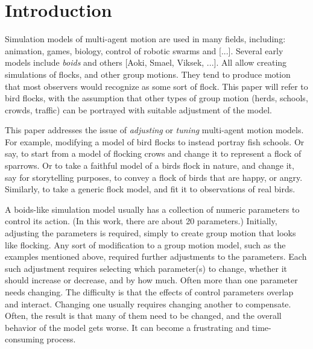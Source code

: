\documentclass[letterpaper]{article}
\begin{document}


\section{Introduction}
\label{sec:intro}

Simulation models of multi-agent motion are used in many fields, including: animation, games, biology, control of robotic swarms and [...]. Several early models include \textit{boids} \citep{reynolds_flocks_1987} and others [Aoki, Smael, Viksek, ...]. All allow creating simulations of flocks, and other group motions.  They tend to produce motion that most observers would recognize as some sort of flock. This paper will refer to bird flocks, with the assumption that other types of group motion (herds, schools, crowds, traffic) can be portrayed with suitable adjustment of the model.
\par

This paper addresses the issue of \textit{adjusting} or \textit{tuning} multi-agent motion models. For example, modifying a model of bird flocks to instead portray fish schools. Or say, to start from a model of flocking crows and change it to represent a flock of sparrows. Or to take a faithful model of a birds flock in nature, and change it, say for storytelling purposes, to convey a flock of birds that are happy, or angry. Similarly, to take a generic flock model, and fit it to observations of real birds.
\par

A boids-like simulation model usually has a collection of numeric parameters to control its action. (In this work, there are about 20 parameters.) Initially, adjusting the parameters is required, simply to create group motion that looks like flocking. Any sort of modification to a group motion model, such as the examples mentioned above, required further adjustments to the parameters. Each such adjustment requires selecting which parameter(s) to change, whether it should increase or decrease, and by how much. Often more than one parameter needs changing. The difficulty is that the effects of control parameters overlap and interact. Changing one usually requires changing another to compensate. Often, the result is that many of them need to be changed, and the overall behavior of the model gets worse. It can become a frustrating and time-consuming process.
\par
\end{document}
